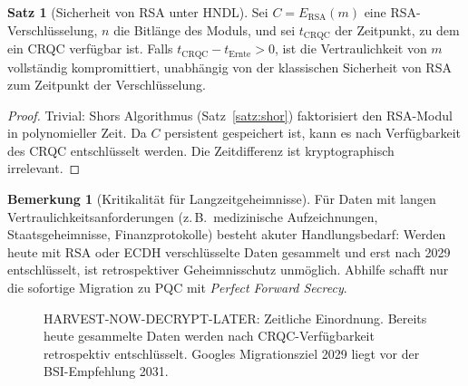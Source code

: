 ﻿\documentclass[a4paper,12pt]{article}
\theoremstyle{definition}
\newtheorem{bemerkung}{Bemerkung}[section]
\newtheorem{satz}{Satz}[section]
\begin{document}
\begin{satz}[Sicherheit von RSA unter HNDL]
Sei $C = E_\mathrm{RSA}(m)$ eine RSA-Verschlüsselung, $n$ die Bitlänge des Moduls,
und sei $t_\mathrm{CRQC}$ der Zeitpunkt, zu dem ein CRQC verfügbar ist.
Falls $t_\mathrm{CRQC} - t_\mathrm{Ernte} > 0$, ist die Vertraulichkeit von $m$
vollständig kompromittiert, unabhängig von der klassischen Sicherheit von RSA
zum Zeitpunkt der Verschlüsselung.
\end{satz}

\begin{proof}
Trivial: Shors Algorithmus (Satz~\ref{satz:shor}) faktorisiert den RSA-Modul
in polynomieller Zeit. Da $C$ persistent gespeichert ist, kann es nach Verfügbarkeit
des CRQC entschlüsselt werden. Die Zeitdifferenz ist kryptographisch irrelevant.
\end{proof}

\begin{bemerkung}[Kritikalität für Langzeitgeheimnisse]
Für Daten mit langen Vertraulichkeitsanforderungen (z.\,B.\ medizinische
Aufzeichnungen, Staatsgeheimnisse, Finanzprotokolle) besteht akuter Handlungsbedarf:
Werden heute mit RSA oder ECDH verschlüsselte Daten gesammelt und erst
nach 2029 entschlüsselt, ist retrospektiver Geheimnisschutz unmöglich.
Abhilfe schafft nur die sofortige Migration zu PQC mit \emph{Perfect Forward Secrecy}.
\end{bemerkung}

\begin{figure}[H]
\centering
{}
\caption{HARVEST-NOW-DECRYPT-LATER: Zeitliche Einordnung. Bereits heute gesammelte Daten werden nach CRQC-Verfügbarkeit retrospektiv entschlüsselt. Googles Migrationsziel 2029 liegt vor der BSI-Empfehlung 2031.}
\label{fig:hndl}
\end{figure}
\end{document}
